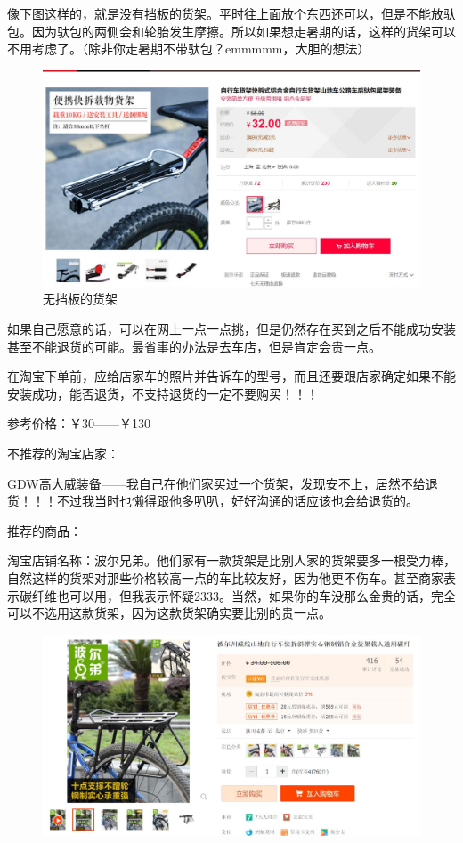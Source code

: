 \documentclass{ctexbook}
\begin{document}
\begin{itemize}
        像下图这样的，就是没有挡板的货架。平时往上面放个东西还可以，但是不能放驮包。因为驮包的两侧会和轮胎发生摩擦。所以如果想走暑期的话，这样的货架可以不用考虑了。（除非你走暑期不带驮包？emmmmm，大胆的想法）
        \begin{figure}[H]
            \centering
            \includegraphics[width=0.7\linewidth]{fig/货架_无挡板}
            \caption{无挡板的货架}
        \end{figure}
        
        如果自己愿意的话，可以在网上一点一点挑，但是仍然存在买到之后不能成功安装甚至不能退货的可能。最省事的办法是去车店，但是肯定会贵一点。
        
        在淘宝下单前，应给店家车的照片并告诉车的型号，而且还要跟店家确定如果不能安装成功，能否退货，不支持退货的一定不要购买！！！

        参考价格：￥30——￥130

        不推荐的淘宝店家：
        
        GDW高大威装备——我自己在他们家买过一个货架，发现安不上，居然不给退货！！！不过我当时也懒得跟他多叭叭，好好沟通的话应该也会给退货的。

        推荐的商品：

        淘宝店铺名称：波尔兄弟。他们家有一款货架是比别人家的货架要多一根受力棒，自然这样的货架对那些价格较高一点的车比较友好，因为他更不伤车。甚至商家表示碳纤维也可以用，但我表示怀疑2333。当然，如果你的车没那么金贵的话，完全可以不选用这款货架，因为这款货架确实要比别的贵一点。

        
        \begin{figure}[ht]
            \begin{center}
            \includegraphics[scale=0.6]{fig/波尔兄弟_货架.jpg}
            \end{center}
        \end{figure}


\end{itemize}
\end{document}
